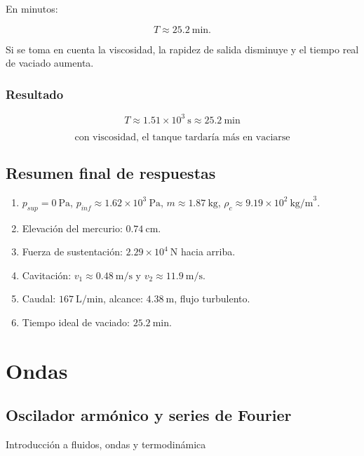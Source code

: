\documentclass[
  letterpaper,
  DIV=11,
  numbers=noendperiod]{scrreprt}
\providecommand{\tightlist}{%
  \setlength{\itemsep}{0pt}\setlength{\parskip}{0pt}}
\begin{document}
En minutos:

\[
T\approx 25.2\ \text{min}.
\]

Si se toma en cuenta la viscosidad, la rapidez de salida disminuye y el
tiempo real de vaciado aumenta.

\section{Resultado}\label{resultado-4}

\[
\boxed{T\approx 1.51\times10^3\ \text{s}\approx 25.2\ \text{min}}
\]

\[
\boxed{\text{con viscosidad, el tanque tardaría más en vaciarse}}
\]

\chapter{Resumen final de respuestas}\label{resumen-final-de-respuestas}

\begin{enumerate}
\def\labelenumi{\arabic{enumi}.}
\tightlist
\item
  \(p_{sup}=0\ \text{Pa}\),
  \(p_{inf}\approx 1.62\times10^3\ \text{Pa}\),
  \(m\approx 1.87\ \text{kg}\),
  \(\rho_c\approx 9.19\times10^2\ \text{kg/m}^3\).
\item
  Elevación del mercurio: \(0.74\ \text{cm}\).
\item
  Fuerza de sustentación: \(2.29\times10^4\ \text{N}\) hacia arriba.
\item
  Cavitación: \(v_1\approx 0.48\ \text{m/s}\) y
  \(v_2\approx 11.9\ \text{m/s}\).
\item
  Caudal: \(167\ \text{L/min}\), alcance: \(4.38\ \text{m}\), flujo
  turbulento.
\item
  Tiempo ideal de vaciado: \(25.2\ \text{min}\).
\end{enumerate}

\part{Ondas}

\chapter{Oscilador armónico y series de
Fourier}\label{oscilador-armuxf3nico-y-series-de-fourier}

Introducción a fluidos, ondas y termodinámica

\hfill\break
\end{document}
